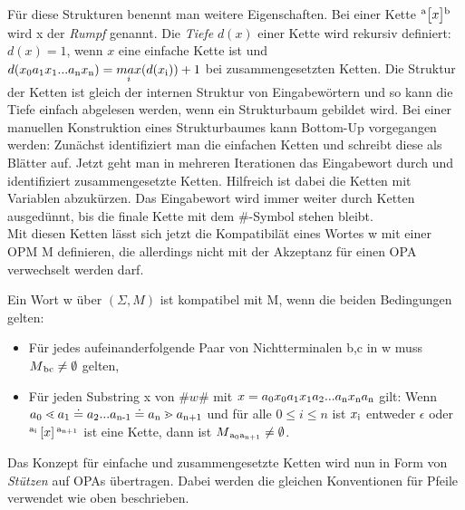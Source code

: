 Für diese Strukturen benennt man weitere Eigenschaften. Bei einer Kette $\textsuperscript{a} \big[ x \big] \textsuperscript{b}$ wird x der \textit{Rumpf} genannt. Die \textit{Tiefe} $d(x)$ einer Kette wird rekursiv definiert: $d(x) = 1$, wenn $x$ eine einfache Kette ist und $d(x\textsubscript{0}a\textsubscript{1} x\textsubscript{1}...a\textsubscript{n} x\textsubscript{n}) = \underset{i}{max}(d(x\textsubscript{i})) + 1$ bei zusammengesetzten Ketten. Die Struktur der Ketten ist gleich der internen Struktur von Eingabewörtern und so kann die Tiefe einfach abgelesen werden, wenn ein Strukturbaum gebildet wird. Bei einer manuellen Konstruktion eines Strukturbaumes kann Bottom-Up vorgegangen werden: Zunächst identifiziert man die einfachen Ketten und schreibt diese als Blätter auf. Jetzt geht man in mehreren Iterationen das Eingabewort durch und identifiziert zusammengesetzte Ketten. Hilfreich ist dabei die Ketten mit Variablen abzukürzen. Das Eingabewort wird immer weiter durch Ketten ausgedünnt, bis die finale Kette mit dem $\#$-Symbol stehen bleibt. \\
Mit diesen Ketten lässt sich jetzt die Kompatibilät eines Wortes w mit einer OPM M definieren, die allerdings nicht mit der Akzeptanz für einen OPA verwechselt werden darf.
\begin{definition}
Ein Wort w über $(\Sigma, M)$ ist kompatibel mit M, wenn die beiden Bedingungen gelten:
\begin{itemize}
\item
Für jedes aufeinanderfolgende Paar von Nichtterminalen b,c in w muss $M\textsubscript{bc}\neq \emptyset$ gelten,
\item
Für jeden Substring x von $\# w\#$ mit $x=a\textsubscript{0}x\textsubscript{0}a\textsubscript{1}x\textsubscript{1}a\textsubscript{2}...a\textsubscript{n}x\textsubscript{n}a\textsubscript{n}$ gilt: Wenn $a\textsubscript{0} \lessdot a\textsubscript{1} \doteq a\textsubscript{2}...a\textsubscript{n-1} \doteq a\textsubscript{n} \gtrdot a\textsubscript{n+1}$ und für alle $0 \leq i \leq n$ ist $x\textsubscript{i}$ entweder $\epsilon$ oder $\textsuperscript{a\textsubscript{i}} \left[ x \right] \textsuperscript{a\textsubscript{n+1}}$ ist eine Kette, dann ist $M\textsubscript{a\textsubscript{0}a\textsubscript{n+1}} \neq \emptyset$.
\end{itemize}
\end{definition}

Das Konzept für einfache und zusammengesetzte Ketten wird nun in Form von \textit{Stützen} auf OPAs übertragen. Dabei werden die gleichen Konventionen für Pfeile verwendet wie oben beschrieben.

